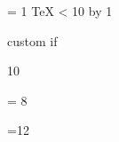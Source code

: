  = 1
\loop
  \TeX
\ifnum{} < 10
\advance{} by 1
\repeat


\if@director
 custom if
\else
\fi





 10

\counting

\newdimen\mydimen

\newcount { \mycounter }

\def\five{5}
\toks \five = 8



=12


